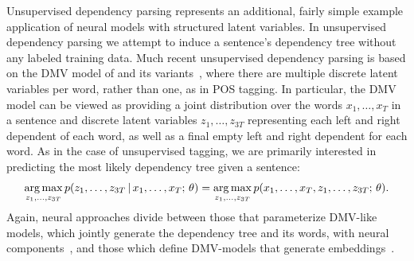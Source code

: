 \documentclass{article}
\begin{document}
Unsupervised dependency parsing represents an additional, fairly simple example application of neural models with structured latent variables. In unsupervised dependency parsing we attempt to induce a sentence's dependency tree without any labeled training data. Much recent unsupervised dependency parsing is based on the DMV model of \citet{klein2004corpus} and its variants~\citep{headden2009improving,spitkovsky2010viterbi,spitkovsky2011unsupervised}, where there are multiple discrete latent variables per word, rather than one, as in POS tagging. In particular, the DMV model can be viewed as providing a joint distribution over the words $x_1, \ldots, x_T$ in a sentence and discrete latent variables $z_1, \ldots, z_{3T}$ representing each left and right dependent of each word, as well as a final empty left and right dependent for each word. As in the case of unsupervised tagging, we are primarily interested in predicting the most likely dependency tree given a sentence:
\begin{align*}
    \argmax_{z_1, \ldots, z_{3T}} p(z_1, \ldots, z_{3T} \given x_1, \ldots, x_T \param \theta) = \argmax_{z_1, \ldots, z_{3T}} p(x_1, \ldots, x_T, z_1, \ldots, z_{3T} \param \theta).
\end{align*}
Again, neural approaches divide between those that parameterize DMV-like models, which jointly generate the dependency tree and its words, with neural components~\citep{jiang2016unsupervised,cai2017crf,han2017dependency}, and those which define DMV-models that generate embeddings~\citep{he2018}.
\end{document}

